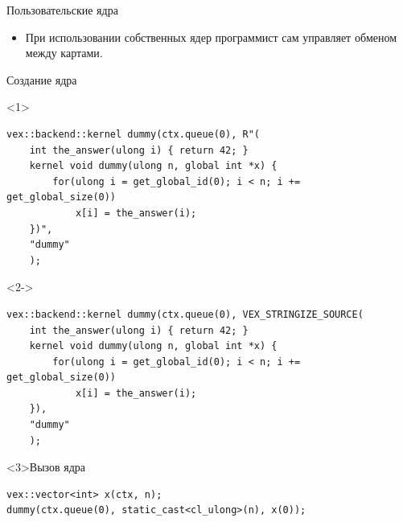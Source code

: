 \documentclass[@BEAMER_OPTIONS@]{beamer}
\begin{document}
\begin{frame}[fragile]{Пользовательские ядра}
    \begin{itemize}
        \item При использовании собственных ядер программист сам управляет
            обменом между картами.
    \end{itemize}
    \begin{exampleblock}{Создание ядра}
        \begin{onlyenv}<1>
            \begin{lstlisting}
vex::backend::kernel dummy(ctx.queue(0), R"(
    int the_answer(ulong i) { return 42; }
    kernel void dummy(ulong n, global int *x) {
        for(ulong i = get_global_id(0); i < n; i += get_global_size(0))
            x[i] = the_answer(i);
    })",
    "dummy"
    );
            \end{lstlisting}
        \end{onlyenv}
        \begin{onlyenv}<2->
            \begin{lstlisting}
vex::backend::kernel dummy(ctx.queue(0), VEX_STRINGIZE_SOURCE(
    int the_answer(ulong i) { return 42; }
    kernel void dummy(ulong n, global int *x) {
        for(ulong i = get_global_id(0); i < n; i += get_global_size(0))
            x[i] = the_answer(i);
    }),
    "dummy"
    );
            \end{lstlisting}
        \end{onlyenv}
    \end{exampleblock}
    \begin{exampleblock}<3>{Вызов ядра}
        \begin{lstlisting}
vex::vector<int> x(ctx, n);
dummy(ctx.queue(0), static_cast<cl_ulong>(n), x(0));
        \end{lstlisting}
    \end{exampleblock}
\end{frame}
\end{document}
